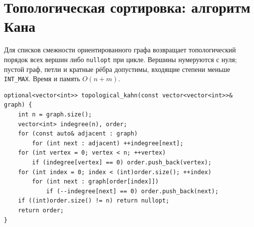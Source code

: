 \section{Топологическая сортировка: алгоритм Кана}
Для списков смежности ориентированного графа возвращает топологический порядок всех вершин либо \texttt{nullopt} при цикле.
Вершины нумеруются с нуля; пустой граф, петли и кратные рёбра допустимы, входящие степени меньше \texttt{INT\_MAX}.
Время и память $O(n+m)$.
\begin{lstlisting}[name=extra_graph_topological]
optional<vector<int>> topological_kahn(const vector<vector<int>>& graph) {
    int n = graph.size();
    vector<int> indegree(n), order;
    for (const auto& adjacent : graph)
        for (int next : adjacent) ++indegree[next];
    for (int vertex = 0; vertex < n; ++vertex)
        if (indegree[vertex] == 0) order.push_back(vertex);
    for (int index = 0; index < (int)order.size(); ++index)
        for (int next : graph[order[index]])
            if (--indegree[next] == 0) order.push_back(next);
    if ((int)order.size() != n) return nullopt;
    return order;
}
\end{lstlisting}
%

